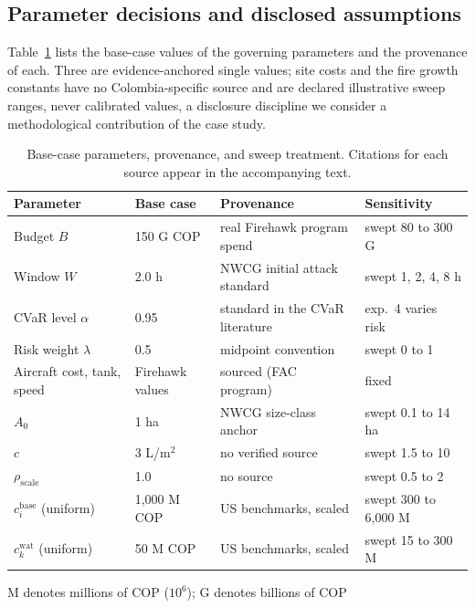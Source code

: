 \documentclass[11pt]{article}
\begin{document}
\subsection{Parameter decisions and disclosed assumptions}
\label{sec:params}

Table~\ref{tab:params} lists the base-case values of the governing
parameters and the provenance of each. Three are evidence-anchored
single values; site costs and the fire growth constants have no
Colombia-specific source and are declared illustrative sweep ranges,
never calibrated values, a disclosure discipline we consider a
methodological contribution of the case study.

\begin{table}[!htbp]
\centering
\begin{threeparttable}
\caption{Base-case parameters, provenance, and sweep treatment.
Citations for each source appear in the accompanying text.}
\label{tab:params}
\footnotesize
\setlength{\tabcolsep}{4.5pt}
\begin{tabular}{llll}
\toprule
Parameter & Base case & Provenance & Sensitivity \\
\midrule
Budget $B$ & 150 G COP & real Firehawk program spend & swept 80 to 300 G \\
Window $W$ & 2.0 h & NWCG initial attack standard & swept 1, 2, 4, 8 h \\
CVaR level $\alpha$ & 0.95 & standard in the CVaR literature & exp.\ 4 varies risk \\
Risk weight $\lambda$ & 0.5 & midpoint convention & swept 0 to 1 \\
Aircraft cost, tank, speed & Firehawk values & sourced (FAC program) & fixed \\
$A_0$ & 1 ha & NWCG size-class anchor\tnote{a} & swept 0.1 to 14 ha \\
$c$ & 3 L/m$^2$ & no verified source & swept 1.5 to 10 \\
$\rho_{\mathrm{scale}}$ & 1.0 & no source & swept 0.5 to 2 \\
$c^{\mathrm{base}}_i$ (uniform) & 1{,}000 M COP & US benchmarks, scaled & swept 300 to 6{,}000 M \\
$c^{\mathrm{wat}}_k$ (uniform) & 50 M COP & US benchmarks, scaled & swept 15 to 300 M \\
\bottomrule
\end{tabular}
\begin{tablenotes}[flushleft]
\footnotesize
\item M denotes millions of COP ($10^6$); G denotes billions of COP

\end{tablenotes}
\end{threeparttable}
\end{table}
\end{document}
